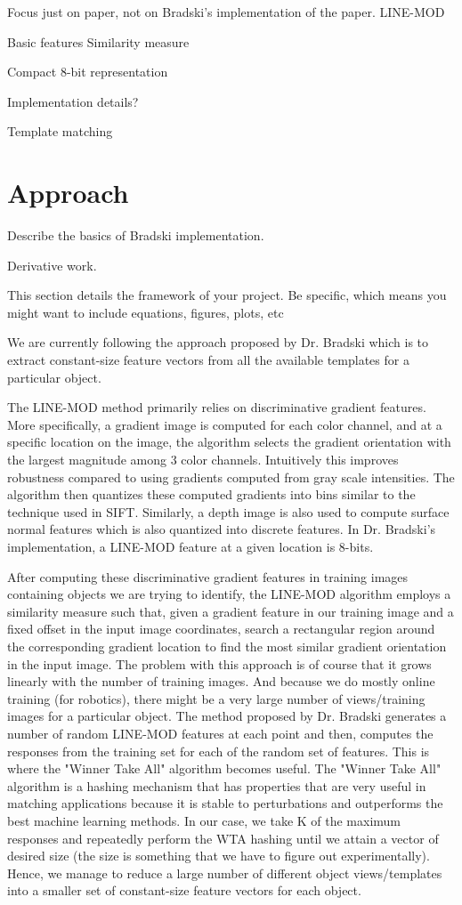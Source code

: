 \documentclass[10pt,twocolumn,letterpaper]{article}
\begin{document}
Focus just on paper, not on Bradski's implementation of the paper.
LINE-MOD

Basic features
Similarity measure

Compact 8-bit representation

Implementation details?

Template matching 

\section{Approach}

Describe the basics of Bradski implementation.

Derivative work.

This section details the framework of your project. Be specific, which means you might want to include equations, figures, plots, etc

We are currently following the approach proposed by Dr. Bradski which is to extract constant-size feature vectors from all the available templates for a particular object.

The LINE-MOD method primarily relies on discriminative gradient features. More specifically, a gradient image is computed for each color channel, and at a specific location on the image, the algorithm selects the gradient orientation with the largest magnitude among 3 color channels. Intuitively this improves robustness compared to using gradients computed from gray scale intensities. The algorithm then quantizes these computed gradients into bins similar to the technique used in SIFT. Similarly, a depth image is also used to compute surface normal features which is also quantized into discrete features. In Dr. Bradski’s implementation, a LINE-MOD feature at a given location is 8-bits.

After computing these discriminative gradient features in training images containing objects we are trying to identify, the LINE-MOD algorithm employs a similarity measure such that, given a gradient feature in our training image and a fixed offset in the input image coordinates, search a rectangular region around the corresponding gradient location to find the most similar gradient orientation in the input image. The problem with this approach is of course that it grows linearly with the number of training images. And because we do mostly online training (for robotics), there might be a very large number of views/training images for a particular object. The method proposed by Dr. Bradski generates a number of random LINE-MOD features at each point and then, computes the responses from the training set for each of the random set of features. This is where the "Winner Take All" algorithm becomes useful. The "Winner Take All" algorithm is a hashing mechanism that has properties that are very useful in matching applications because it is stable to perturbations and outperforms the best machine learning methods. In our case, we take K of the maximum responses and repeatedly perform the WTA hashing until we attain a vector of desired size (the size is something that we have to figure out experimentally). Hence, we manage to reduce a large number of different object views/templates into a smaller set of constant-size feature vectors for each object.
\end{document}
